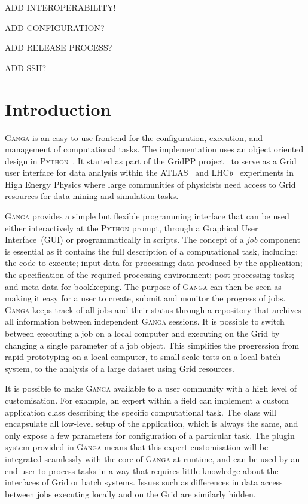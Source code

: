 \documentclass{elsart}
\def\lhcb {LHC{\em b\/}\xspace}
\def\atlas {ATLAS\xspace}
\def\ganga {\textsc{Ganga}\xspace}
\def\python {\textsc{Python}\xspace}
\def\grid {Grid\xspace}
\begin{document}
ADD INTEROPERABILITY!

ADD CONFIGURATION?

ADD RELEASE PROCESS?

ADD SSH?

\section{Introduction}
\label{sec:intro}
\ganga is an easy-to-use frontend for the configuration, execution, and
management of computational tasks. The implementation uses an object oriented
design in \python~\cite{python}. It started as part of the GridPP
project~\cite{Faulkner:2006px} to serve as a \grid user interface for data
analysis within the \atlas~\cite{ATLAS} and
\lhcb~\cite{LHCb} experiments in High Energy Physics where large
communities of physicists need access to \grid resources for data mining
and simulation tasks.

\ganga provides a simple but flexible programming interface that can
be used either interactively at the \python prompt, through a
Graphical User Interface~(GUI) or programmatically in scripts. The
concept of a \emph{job} component is essential as it contains the full
description of a computational task, including: the code to execute;
input data for processing; data produced by the application; the
specification of the required processing environment; post-processing
tasks; and meta-data for bookkeeping.  The purpose of \ganga can then
be seen as making it easy for a user to create, submit and monitor the
progress of jobs. \ganga keeps track of all jobs and their status
through a repository that archives all information between independent
\ganga sessions. It is possible to switch between executing a job on a
local computer and executing on the \grid by changing a single parameter of a job object. 
This simplifies the progression from rapid prototyping on a local
computer, to small-scale tests on a local batch system, to the analysis of a
large dataset using \grid resources.

It is possible to make \ganga available to a user community with a high level
of customisation. For example, an expert within a field can implement a custom
application class describing the specific computational task. The class will
encapsulate all low-level setup of the application, which is always
the same, and only expose a few parameters for configuration of a particular
task. The plugin system provided in \ganga means that this expert
customisation will be integrated seamlessly with the core of \ganga at runtime,
and can be used by an end-user to process tasks in a way that requires
little knowledge about the interfaces of \grid or batch systems. Issues such as
differences in data access between jobs executing locally and on the
\grid are similarly hidden.
\end{document}
